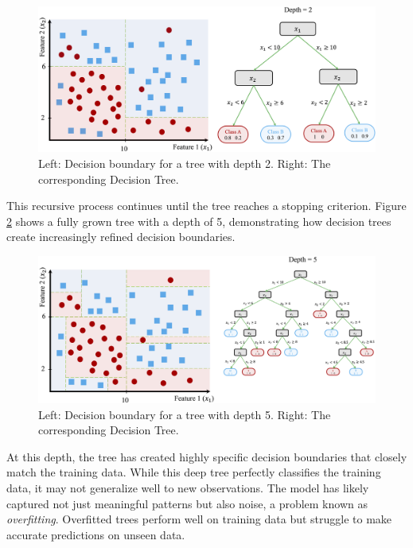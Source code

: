 \documentclass[
]{book}
\theoremstyle{definition}
\theoremstyle{definition}
\theoremstyle{definition}
\theoremstyle{definition}
\theoremstyle{remark}
\begin{document}
\begin{figure}

{\centering \includegraphics[width=1\linewidth]{images/ch11_ex_tree_3} 

}

\caption{Left: Decision boundary for a tree with depth 2. Right: The corresponding Decision Tree.}\label{fig:tree-3}
\end{figure}

This recursive process continues until the tree reaches a stopping criterion. Figure \ref{fig:tree-4} shows a fully grown tree with a depth of 5, demonstrating how decision trees create increasingly refined decision boundaries.

\begin{figure}

{\centering \includegraphics[width=1\linewidth]{images/ch11_ex_tree_4} 

}

\caption{Left: Decision boundary for a tree with depth 5. Right: The corresponding Decision Tree.}\label{fig:tree-4}
\end{figure}

At this depth, the tree has created highly specific decision boundaries that closely match the training data. While this deep tree perfectly classifies the training data, it may not generalize well to new observations. The model has likely captured not just meaningful patterns but also noise, a problem known as \emph{overfitting}. Overfitted trees perform well on training data but struggle to make accurate predictions on unseen data.
\end{document}
